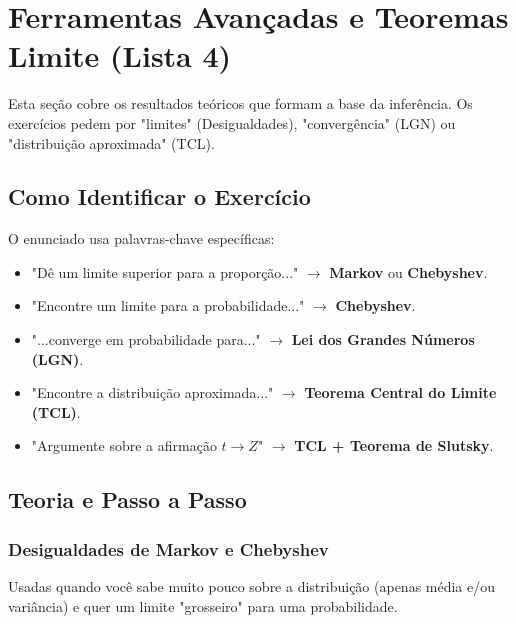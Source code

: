 
\section{Ferramentas Avançadas e Teoremas Limite (Lista 4)}
\label{sec:limite}

Esta seção cobre os resultados teóricos que formam a base da inferência. Os exercícios pedem por "limites" (Desigualdades), "convergência" (LGN) ou "distribuição aproximada" (TCL).

\subsection{Como Identificar o Exercício}
O enunciado usa palavras-chave específicas:
\begin{itemize}
    \item "Dê um limite superior para a proporção..." $\rightarrow$ \textbf{Markov} ou \textbf{Chebyshev}.
    \item "Encontre um limite para a probabilidade..." $\rightarrow$ \textbf{Chebyshev}.
    \item "...converge em probabilidade para..." $\rightarrow$ \textbf{Lei dos Grandes Números (LGN)}.
    \item "Encontre a distribuição aproximada..." $\rightarrow$ \textbf{Teorema Central do Limite (TCL)}.
    \item "Argumente sobre a afirmação $t \rightarrow Z$" $\rightarrow$ \textbf{TCL + Teorema de Slutsky}.
\end{itemize}

\subsection{Teoria e Passo a Passo}

\subsubsection{Desigualdades de Markov e Chebyshev}
Usadas quando você sabe muito pouco sobre a distribuição (apenas média e/ou variância) e quer um limite "grosseiro" para uma probabilidade.

